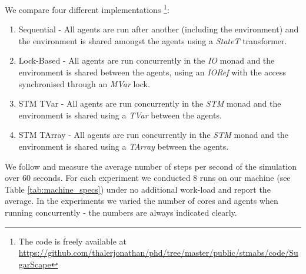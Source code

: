 We compare four different implementations \footnote{The code is freely available at \url{https://github.com/thalerjonathan/phd/tree/master/public/stmabs/code/SugarScape}}:

\begin{enumerate}
	\item Sequential - All agents are run after another (including the environment) and the environment is shared amongst the agents using a \textit{StateT} transformer.
	\item Lock-Based - All agents are run concurrently in the \textit{IO} monad and the environment is shared between the agents, using an \textit{IORef} with the access synchronised through an \textit{MVar} lock.
	\item STM TVar - All agents are run concurrently in the \textit{STM} monad and the environment is shared using a \textit{TVar} between the agents.
	\item STM TArray - All agents are run concurrently in the \textit{STM} monad and the environment is shared using a \textit{TArray} between the agents. 
\end{enumerate}

We follow \cite{lysenko_framework_2008} and measure the average number of steps per second of the simulation over 60 seconds. For each experiment we conducted 8 runs on our machine (see Table \ref{tab:machine_specs}) under no additional work-load and report the average. In the experiments we varied the number of cores and agents when running concurrently - the numbers are always indicated clearly.


